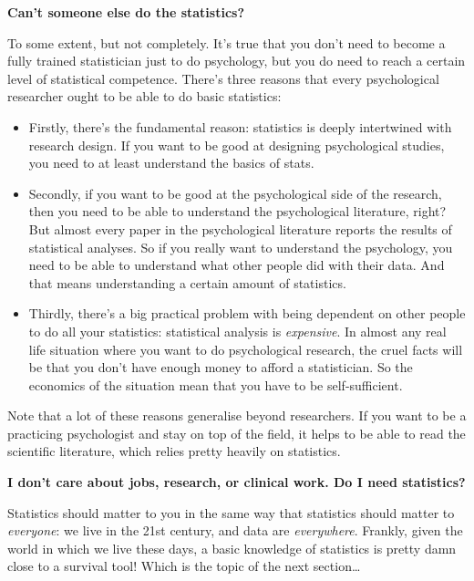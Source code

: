 \documentclass[
  11pt,
]{book}
\providecommand{\tightlist}{%
  \setlength{\itemsep}{0pt}\setlength{\parskip}{0pt}}
\theoremstyle{definition}
\theoremstyle{definition}
\theoremstyle{definition}
\theoremstyle{definition}
\theoremstyle{remark}
\begin{document}
\textbf{Can't someone else do the statistics?}

\nopagebreak[4]

To some extent, but not completely. It's true that you don't need to become a fully trained statistician just to do psychology, but you do need to reach a certain level of statistical competence. There's three reasons that every psychological researcher ought to be able to do basic statistics:

\begin{itemize}
\tightlist
\item
  Firstly, there's the fundamental reason: statistics is deeply intertwined with research design. If you want to be good at designing psychological studies, you need to at least understand the basics of stats.
\item
  Secondly, if you want to be good at the psychological side of the research, then you need to be able to understand the psychological literature, right? But almost every paper in the psychological literature reports the results of statistical analyses. So if you really want to understand the psychology, you need to be able to understand what other people did with their data. And that means understanding a certain amount of statistics.
\item
  Thirdly, there's a big practical problem with being dependent on other people to do all your statistics: statistical analysis is \emph{expensive}. In almost any real life situation where you want to do psychological research, the cruel facts will be that you don't have enough money to afford a statistician. So the economics of the situation mean that you have to be self-sufficient.
\end{itemize}

Note that a lot of these reasons generalise beyond researchers. If you want to be a practicing psychologist and stay on top of the field, it helps to be able to read the scientific literature, which relies pretty heavily on statistics.

\textbf{I don't care about jobs, research, or clinical work. Do I need statistics?}

\nopagebreak[4]

Statistics should matter to you in the same way that statistics should matter to \emph{everyone}: we live in the 21st century, and data are \emph{everywhere}. Frankly, given the world in which we live these days, a basic knowledge of statistics is pretty damn close to a survival tool! Which is the topic of the next section\ldots{}
\end{document}
